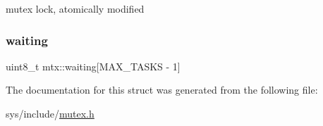 mutex lock, atomically modified \mbox{\label{structmtx_a14e1d218cc3d0cd3e74ae6de1eb69212}} 
\subsubsection{\texorpdfstring{waiting}{waiting}}
{\footnotesize\ttfamily uint8\+\_\+t mtx\+::waiting\mbox{[}M\+A\+X\+\_\+\+T\+A\+S\+KS -\/ 1\mbox{]}}



The documentation for this struct was generated from the following file\+:\begin{DoxyCompactItemize}
\item 
sys/include/\hyperlink{mutex_8h}{mutex.\+h}\end{DoxyCompactItemize}
